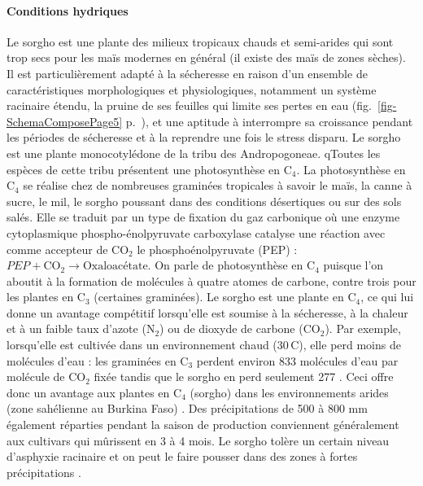 \documentclass[a4paper,11pt]{article}
\begin{document}
\paragraph{Conditions hydriques} Le sorgho est une plante des milieux
tropicaux chauds et semi-arides qui sont trop secs pour les maïs
modernes en général (il existe des maïs de zones sèches). Il est
particulièrement adapté à la sécheresse en raison d'un ensemble de
caractéristiques morphologiques et physiologiques, notamment un
système racinaire étendu, la pruine de ses feuilles qui limite ses
pertes en eau (fig.~\ref{fig-SchemaComposePage5}
p.~\pageref{fig-SchemaComposePage5}), et une aptitude à interrompre sa
croissance pendant les périodes de sécheresse et à la reprendre une
fois le stress disparu. Le sorgho est une plante monocotylédone de la
tribu des Andropogoneae. qToutes les espèces de cette tribu présentent
une photosynthèse en $\text{C}_4$. La photosynthèse en $\text{C}_4$ se
réalise chez de nombreuses graminées tropicales à savoir le maïs, la
canne à sucre, le mil, le sorgho poussant dans des conditions
désertiques ou sur des sols salés. Elle se traduit par un type de
fixation du gaz carbonique où une enzyme cytoplasmique
phospho-énolpyruvate carboxylase catalyse une réaction avec comme
accepteur de $\text{CO}_2$ le phosphoénolpyruvate (PEP) :
$PEP + \text{CO}_2 \longrightarrow \text{Oxaloacétate}$. On parle de
photosynthèse en $\text{C}_4$ puisque l'on aboutit à la formation de
molécules à quatre atomes de carbone, contre trois pour les plantes en
$\text{C}_3$ (certaines graminées). Le sorgho est une plante en
$\text{C}_4$, ce qui lui donne un avantage compétitif lorsqu'elle est
soumise à la sécheresse, à la chaleur et à un faible taux d'azote
($\text{N}_2$) ou de dioxyde de carbone ($\text{CO}_2$). Par exemple,
lorsqu'elle est cultivée dans un environnement chaud (30\,\degree{}C),
elle perd moins de molécules d'eau : les graminées en $\text{C}_3$
perdent environ 833 molécules d'eau par molécule de $\text{CO}_2$
fixée tandis que le sorgho en perd seulement 277
\cite{sage1998c4}. Ceci offre donc un avantage aux plantes en
$\text{C}_4$ (sorgho) dans les environnements arides (zone sahélienne
au Burkina Faso) \cite{sage1998c4}. Des précipitations de 500 à 800 mm
également réparties pendant la saison de production conviennent
généralement aux cultivars qui mûrissent en 3 à 4 mois. Le sorgho
tolère un certain niveau d'asphyxie racinaire et on peut le faire
pousser dans des zones à fortes précipitations
\cite{BARRO_KONDOMBO_2010}.
\end{document}
